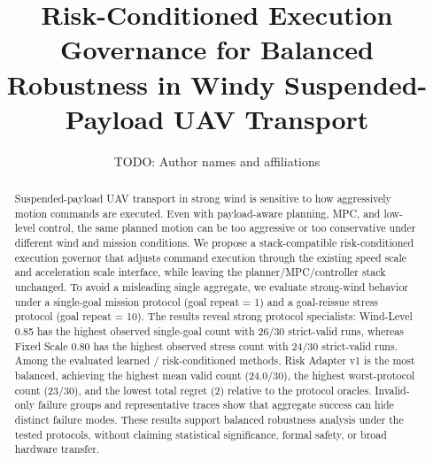 \documentclass[letterpaper, 10 pt, conference]{ieeeconf}
\title{\LARGE \bf
Risk-Conditioned Execution Governance for Balanced Robustness in Windy Suspended-Payload UAV Transport}
\author{TODO: Author names and affiliations}
\begin{document}
\maketitle

\begin{abstract}
Suspended-payload UAV transport in strong wind is sensitive to how aggressively
motion commands are executed. Even with payload-aware planning, MPC, and
low-level control, the same planned motion can be too aggressive or too
conservative under different wind and mission conditions. We propose a
stack-compatible risk-conditioned execution governor that adjusts command
execution through the existing speed scale and acceleration scale interface,
while leaving the planner/MPC/controller stack unchanged. To avoid a
misleading single aggregate, we evaluate strong-wind behavior under a
single-goal mission protocol (goal repeat = 1) and a goal-reissue stress
protocol (goal repeat = 10). The results reveal strong protocol specialists:
Wind-Level 0.85 has the highest observed single-goal count with 26/30
strict-valid runs, whereas Fixed Scale 0.80 has the highest observed stress
count with 24/30 strict-valid runs. Among the evaluated learned /
risk-conditioned methods, Risk Adapter v1 is the most balanced, achieving the
highest mean valid count (24.0/30), the highest worst-protocol count (23/30),
and the lowest total regret (2) relative to the protocol oracles. Invalid-only
failure groups and representative traces show that aggregate success can hide
distinct failure modes. These results support balanced robustness analysis
under the tested protocols, without claiming statistical significance, formal
safety, or broad hardware transfer.
\end{abstract}











\end{document}
